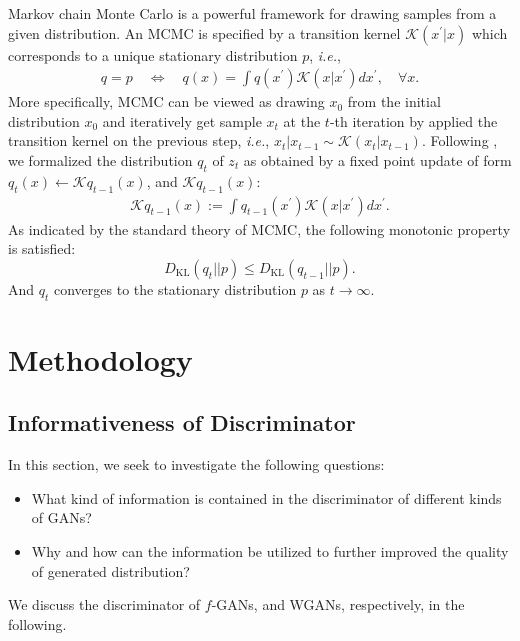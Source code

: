 \documentclass{article}
\newcommand{\KL}{D_{\mathrm{KL}}}
\begin{document}
Markov chain Monte Carlo is a powerful framework for drawing samples from a given distribution. An MCMC is specified by a transition kernel $\mathcal{K}(x^{\prime}|x)$ which corresponds to a unique stationary distribution $p$, \emph{i.e.},
\begin{align*}
    q=p \quad \Leftrightarrow \quad q(x)=\int q\left(x^{\prime}\right) \mathcal{K}\left(x | x^{\prime}\right) d x^{\prime}, \quad \forall x.
\end{align*}
More specifically, MCMC can be viewed as drawing $x_0$ from the initial distribution $x_0$ and iteratively get sample $x_t$ at the $t$-th iteration by applied the transition kernel on the previous step, \emph{i.e.}, $x_t|x_{t-1} \sim \mathcal{K}(x_t|x_{t-1})$. Following \cite{li2017approximate}, we formalized the distribution $q_t$ of $z_t$ as obtained by a fixed point update of form $q_{t}(x) \leftarrow \mathcal{K} q_{t-1}(x)$, and $\mathcal{K} q_{t-1}(x)$:
\begin{align*}
  \mathcal{K} q_{t-1}(x):=\int q_{t-1}\left(x^{\prime}\right) \mathcal{K}\left(x | x^{\prime}\right) d x^{\prime}.
\end{align*}
As indicated by the standard theory of MCMC, the following monotonic property is satisfied:
\begin{equation}
\label{MCMC_monotic}
        \KL(q_t||p) \leq \KL(q_{t-1}||p).
\end{equation}
And $q_t$ converges to the stationary distribution $p$ as $t \rightarrow \infty$.

\section{Methodology}
\label{sec:methodology}
\subsection{Informativeness of Discriminator}\label{sec::iod}
In this section, we seek to investigate the following questions:
\begin{itemize}
\vspace{-3pt}
    \item What kind of information is contained in the discriminator of different kinds of GANs?
    \vspace{-1pt}
    \item Why and how can the information be utilized to further improved the quality of generated distribution?
\vspace{-3pt}
\end{itemize}
We discuss the discriminator of $f$-GANs, and WGANs, respectively, in the following.
\end{document}
